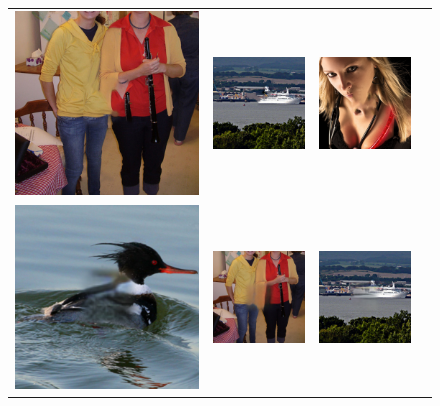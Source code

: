 \begin{figure}[H]
\begin{tabular}{cccc}
  \includegraphics[width=.24\textwidth]{figures/imagenet/imagenet_0034_pm.jpg}&
  \includegraphics[width=.24\textwidth]{figures/imagenet/imagenet_0165_pm.jpg}&
  \includegraphics[width=.24\textwidth]{figures/imagenet/imagenet_0197_pm.png}\\
  \includegraphics[width=.24\textwidth]{figures/imagenet/0011_ce2.jpg}&
  \includegraphics[width=.24\textwidth]{figures/imagenet/0034_ce2.jpg}&
  \includegraphics[width=.24\textwidth]{figures/imagenet/0165_ce2.jpg}&

\end{tabular}
\end{figure}
